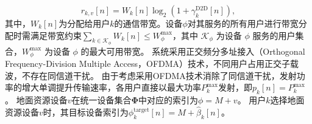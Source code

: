 \begin{equation}
r_{k,v}[n] = W_k[n] \log_2 \left(1 + \gamma_k^{\text{D2D}}[n]\right),
\end{equation}
其中，$W_k[n]$为分配给用户$k$的通信带宽。设备$\phi$对其服务的所有用户进行带宽分配时需满足带宽约束$\sum_{k \in \mathcal{K}_\phi} W_k[n] \le W_\phi^{\max}$，其中 $\mathcal{K}_\phi$ 为设备 $\phi$ 服务的用户集合，$W_\phi^{\max}$ 为设备 $\phi$ 的最大可用带宽。
系统采用正交频分多址接入（Orthogonal Frequency-Division Multiple Access，OFDMA）技术\supercite{Zeng_2021_TWC_Trajectory}，不同用户占用正交子载波，不存在同信道干扰。
由于考虑采用OFDMA技术消除了同信道干扰，发射功率的增大单调提升传输速率，各用户直接以最大功率$P_k^{\max}$发射，即$p_k[n]=P_k^{\max}$。
地面资源设备$v$在统一设备集合$\boldsymbol{\Phi}$中对应的索引为$\phi=M+v$。
用户$k$选择地面资源设备$v$时，其目标设备索引为$\phi_k^{\text{target}}[n]=M+\hat{\beta}_k[n]$。

